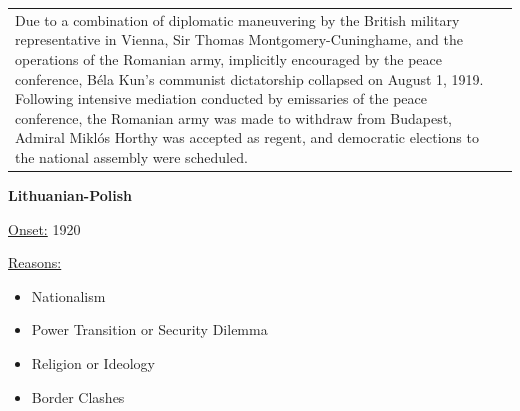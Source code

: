 {\begin{longtable}{p{}p{}}
Due to a combination of diplomatic maneuvering by the British military representative in Vienna, Sir Thomas Montgomery-Cuninghame, and the operations of the Romanian army, implicitly encouraged by the peace conference, Béla Kun's communist dictatorship collapsed on August 1, 1919. Following intensive mediation conducted by emissaries of the peace conference, the Romanian army was made to withdraw from Budapest, Admiral Miklós Horthy was accepted as regent, and democratic elections to the national assembly were scheduled.
\\
\end{longtable}}
\clearpage
         \textbf{Lithuanian-Polish} 

          \underline{Onset:} 1920         

\underline{Reasons:}
\begin{itemize}
\item Nationalism
\item Power Transition or Security Dilemma
\item Religion or Ideology
\item Border Clashes
\end{itemize}

